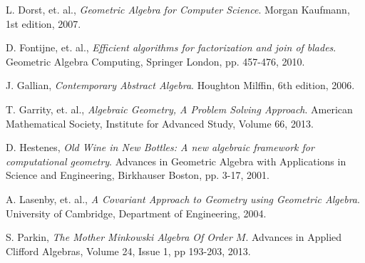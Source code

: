 \documentclass{birkjour}
\theoremstyle{definition}
\theoremstyle{remark}
\numberwithin{equation}{section}
\begin{document}
\begin{thebibliography}{9}

L. Dorst, et. al.,
\emph{Geometric Algebra for Computer Science}.
Morgan Kaufmann, 1st edition, 2007.

D. Fontijne, et. al.,
\emph{Efficient algorithms for factorization and join of blades}.
Geometric Algebra Computing, Springer London, pp. 457-476, 2010.

J. Gallian,
\emph{Contemporary Abstract Algebra}.
Houghton Milffin, 6th edition, 2006.

T. Garrity, et. al.,
\emph{Algebraic Geometry, A Problem Solving Approach}.
American Mathematical Society, Institute for Advanced Study,
Volume 66, 2013.

D. Hestenes,
\emph{Old Wine in New Bottles: A new algebraic framework for computational geometry}.
Advances in Geometric Algebra with Applications in Science and Engineering,
Birkhauser Boston, pp. 3-17, 2001.

A. Lasenby, et. al.,
\emph{A Covariant Approach to Geometry using Geometric Algebra}.
University of Cambridge, Department of Engineering, 2004.

S. Parkin,
\emph{The Mother Minkowski Algebra Of Order $M$}.
Advances in Applied Clifford Algebras, Volume 24, Issue 1, pp 193-203, 2013.

\end{thebibliography}
\end{document}
